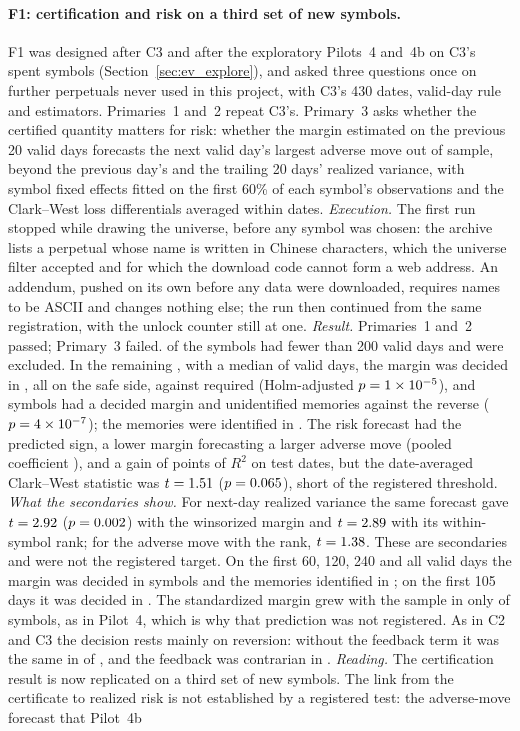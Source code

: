 \paragraph{F1: certification and risk on a third set of new symbols.} F1 was designed after C3 and after the exploratory Pilots~4 and~4b on C3's spent symbols (Section~\ref{sec:ev_explore}), and asked three questions once on \FoneDrawn{} further perpetuals never used in this project, with C3's 430 dates, valid-day rule and estimators. Primaries~1 and~2 repeat C3's. Primary~3 asks whether the certified quantity matters for risk: whether the margin estimated on the previous 20 valid days forecasts the next valid day's largest adverse move out of sample, beyond the previous day's and the trailing 20 days' realized variance, with symbol fixed effects fitted on the first 60\% of each symbol's observations and the Clark--West loss differentials averaged within dates. \emph{Execution.} The first run stopped while drawing the universe, before any symbol was chosen: the archive lists a perpetual whose name is written in Chinese characters, which the universe filter accepted and for which the download code cannot form a web address. An addendum, pushed on its own before any data were downloaded, requires names to be ASCII and changes nothing else; the run then continued from the same registration, with the unlock counter still at one. \emph{Result.} Primaries~1 and~2 passed; Primary~3 failed. \FoneExcluded{} of the \FoneDrawn{} symbols had fewer than 200 valid days and were excluded. In the remaining \FoneSymbols{}, with a median of \FoneDays{} valid days, the margin was decided in \FoneDecided{}, all on the safe side, against \FoneNeed{} required (Holm-adjusted $p=1\times10^{-5}$), and \FoneB{} symbols had a decided margin and unidentified memories against \FoneC{} the reverse ($p=4\times10^{-7}$); the memories were identified in \FoneIdentified{}. The risk forecast had the predicted sign, a lower margin forecasting a larger adverse move (pooled coefficient \FoneRiskCoef{}), and a gain of \FoneRiskGain{} points of $R^2$ on \FoneRiskDates{} test dates, but the date-averaged Clark--West statistic was $t=1.51$ ($p=0.065$), short of the registered threshold. \emph{What the secondaries show.} For next-day realized variance the same forecast gave $t=2.92$ ($p=0.002$) with the winsorized margin and $t=2.89$ with its within-symbol rank; for the adverse move with the rank, $t=1.38$. These are secondaries and were not the registered target. On the first 60, 120, 240 and all valid days the margin was decided in \FoneCurve{} symbols and the memories identified in \FoneCurveId{}; on the first 105 days it was decided in \FoneFirst{}. The standardized margin grew with the sample in only \FoneSlopePos{} of \FoneSymbols{} symbols, as in Pilot~4, which is why that prediction was not registered. As in C2 and C3 the decision rests mainly on reversion: without the feedback term it was the same in \FoneSameNoFb{} of \FoneSymbols{}, and the feedback was contrarian in \FoneFbNeg{}. \emph{Reading.} The certification result is now replicated on a third set of new symbols. The link from the certificate to realized risk is not established by a registered test: the adverse-move forecast that Pilot~4b 